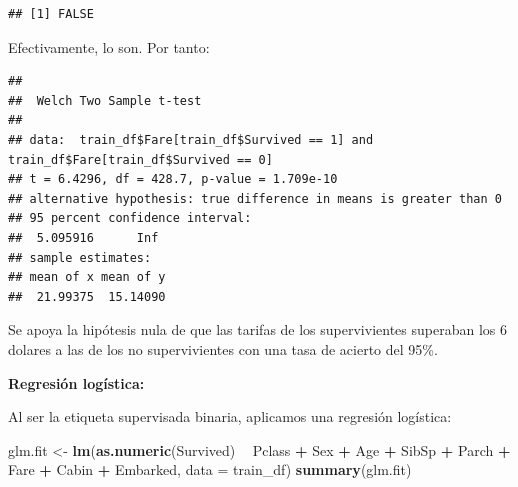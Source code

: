 \documentclass[]{article}
\newenvironment{Shaded}{\begin{snugshade}}{\end{snugshade}}
\newcommand{\DataTypeTok}[1]{\textcolor[rgb]{0.13,0.29,0.53}{#1}}
\newcommand{\DecValTok}[1]{\textcolor[rgb]{0.00,0.00,0.81}{#1}}
\newcommand{\KeywordTok}[1]{\textcolor[rgb]{0.13,0.29,0.53}{\textbf{#1}}}
\newcommand{\NormalTok}[1]{#1}
\newcommand{\OperatorTok}[1]{\textcolor[rgb]{0.81,0.36,0.00}{\textbf{#1}}}
\newcommand{\OtherTok}[1]{\textcolor[rgb]{0.56,0.35,0.01}{#1}}
\newcommand{\StringTok}[1]{\textcolor[rgb]{0.31,0.60,0.02}{#1}}
\begin{document}
\begin{verbatim}
## [1] FALSE
\end{verbatim}

Efectivamente, lo son. Por tanto:

\begin{Shaded}
\end{Shaded}

\begin{verbatim}
## 
##  Welch Two Sample t-test
## 
## data:  train_df$Fare[train_df$Survived == 1] and train_df$Fare[train_df$Survived == 0]
## t = 6.4296, df = 428.7, p-value = 1.709e-10
## alternative hypothesis: true difference in means is greater than 0
## 95 percent confidence interval:
##  5.095916      Inf
## sample estimates:
## mean of x mean of y 
##  21.99375  15.14090
\end{verbatim}

Se apoya la hipótesis nula de que las tarifas de los supervivientes
superaban los 6 dolares a las de los no supervivientes con una tasa de
acierto del 95\%.

\textbf{Regresión logística:}

Al ser la etiqueta supervisada binaria, aplicamos una regresión
logística:

\begin{Shaded}
\begin{Highlighting}[]
\NormalTok{glm.fit <-}\StringTok{ }\KeywordTok{lm}\NormalTok{(}\KeywordTok{as.numeric}\NormalTok{(Survived) }\OperatorTok{~}\StringTok{ }\NormalTok{Pclass }\OperatorTok{+}\StringTok{ }\NormalTok{Sex }\OperatorTok{+}\StringTok{ }\NormalTok{Age }\OperatorTok{+}\StringTok{ }\NormalTok{SibSp }\OperatorTok{+}\StringTok{ }\NormalTok{Parch }\OperatorTok{+}\StringTok{ }\NormalTok{Fare }\OperatorTok{+}\StringTok{ }\NormalTok{Cabin }\OperatorTok{+}\StringTok{ }\NormalTok{Embarked, }\DataTypeTok{data =}\NormalTok{ train_df)}
\KeywordTok{summary}\NormalTok{(glm.fit)}
\end{Highlighting}
\end{Shaded}
\end{document}
